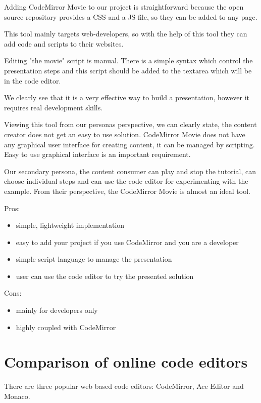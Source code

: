 \documentclass[11pt, a4paper, oneside, openright, medskipamount]{report}
\begin{document}
Adding CodeMirror Movie to our project is straightforward because the open source repository provides a CSS and a JS file, so they can be added to any page.

This tool mainly targets web-developers, so with the help of this tool they can add code and scripts to their websites.

Editing "the movie" script is manual. There is a simple syntax which control the presentation steps and this script should be added to the textarea which will be in the code editor.

We clearly see that it is a very effective way to build a presentation, however it requires real development skills.

Viewing this tool from our personas perspective, we can clearly state, the content creator does not get an easy to use solution. CodeMirror Movie does not have any graphical user interface for creating content, it can be managed by scripting. Easy to use graphical interface is an important requirement.

Our secondary persona, the content consumer can play and stop the tutorial, can choose individual steps and can use the code editor for experimenting with the example. From their perspective, the CodeMirror Movie is almost an ideal tool.

\noindent Pros:
\begin{itemize}[noitemsep]
\item simple, lightweight implementation
\item easy to add your project if you use CodeMirror and you are a developer
\item simple script language to manage the presentation
\item user can use the code editor to try the presented solution
\end{itemize}
Cons:
\begin{itemize}[noitemsep]
\item mainly for developers only
\item highly coupled with CodeMirror
\end{itemize}

\section{Comparison of online code editors} \label{comparison}

There are three popular web based code editors: CodeMirror, Ace Editor and Monaco.
\end{document}
